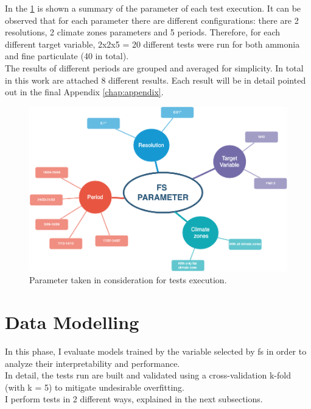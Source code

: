 In the \ref{fig:test_params} is shown a summary of the parameter of each test execution.
It can be observed that for each parameter there are different configurations: there are 2 resolutions, 2 climate zones parameters and 5 periods. Therefore, for each different target variable, 2x2x5 = 20 different tests were run for both ammonia and fine particulate (40 in total). \\
The results of different periods are grouped and averaged for simplicity. In total in this work are attached 8 different results. Each result will be in detail pointed out in the final Appendix \ref{chap:appendix}.
\begin{figure}[H]
    \centering
    \includegraphics[width=.9\textwidth]{images/test_param.png}
    \caption{Parameter taken in consideration for tests execution.}
    \label{fig:test_params}
\end{figure}
\bigbreak
\section{Data Modelling}
In this phase, I evaluate models trained by the variable selected by \acrshort{fs} in order to analyze their interpretability and performance.\\
In detail, the tests run are built and validated using a cross-validation k-fold (with k = 5) to mitigate undesirable overfitting. \\
I perform tests in 2 different ways, explained in the next subsections.
